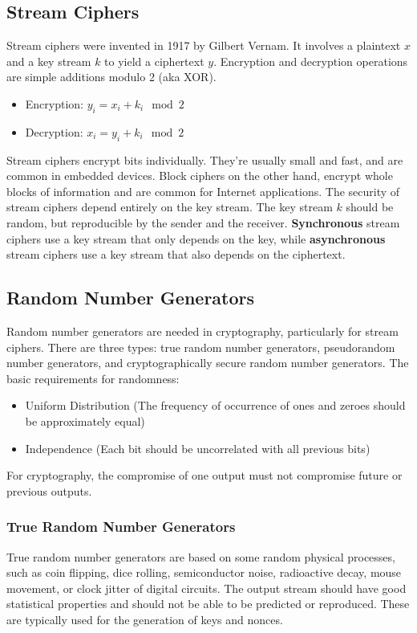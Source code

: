 \documentclass{math}
\begin{document}
\subsection*{Stream Ciphers}
Stream ciphers were invented in 1917 by Gilbert Vernam. It involves a plaintext
\( x \) and a key stream \( k \) to yield a ciphertext \( y \). Encryption
and decryption operations are simple additions modulo 2 (aka XOR).
\begin{itemize}
  \item Encryption: \( y_i = x_i+k_i\mod2 \)
  \item Decryption: \( x_i = y_i+k_i\mod2 \)
\end{itemize}
Stream ciphers encrypt bits individually. They're usually small and fast, and
are common in embedded devices. Block ciphers on the other hand, encrypt whole
blocks of information and are common for Internet applications. The security of
stream ciphers depend entirely on the key stream. The key stream \( k \) should
be random, but reproducible by the sender and the receiver. \textbf{Synchronous}
stream ciphers use a key stream that only depends on the key, while
\textbf{asynchronous} stream ciphers use a key stream that also depends on the
ciphertext.

\subsection*{Random Number Generators}
Random number generators are needed in cryptography, particularly for stream
ciphers. There are three types: true random number generators, pseudorandom
number generators, and cryptographically secure random number generators. The
basic requirements for randomness:
\begin{itemize}
  \item Uniform Distribution (The frequency of occurrence of ones and zeroes
  should be approximately equal)
  \item Independence (Each bit should be uncorrelated with all previous bits)
\end{itemize}
For cryptography, the compromise of one output must not compromise future or
previous outputs.

\subsubsection*{True Random Number Generators}
True random number generators are based on some random physical processes, such
as coin flipping, dice rolling, semiconductor noise, radioactive decay, mouse
movement, or clock jitter of digital circuits. The output stream should have
good statistical properties and should not be able to be predicted or
reproduced. These are typically used for the generation of keys and nonces.
\end{document}
